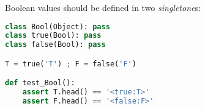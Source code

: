 \clearpage{}

Boolean values should be defined in two \emph{singletone}s:

\begin{lstlisting}[language=Python]
class Bool(Object): pass
class true(Bool): pass
class false(Bool): pass

T = true('T') ; F = false('F')

def test_Bool():
    assert T.head() == '<true:T>'
    assert F.head() == '<false:F>'
\end{lstlisting}
